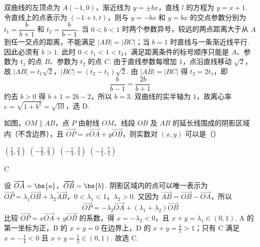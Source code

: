 \begin{solution}
双曲线的左顶点为 \(A(-1,0)\)，渐近线为 \(y=\pm bx\)，直线 \(l\) 的方程为 \(y=x+1\). 令直线上的点表示为 \((-1+t,t)\)，则与 \(y=-bx\) 和 \(y=bx\) 的交点参数分别为 \(t_1=\dfrac{b}{b+1}\) 和 \(t_2=\dfrac{b}{b-1}\). 当 \(0<b<1\) 时两个参数异号，较远的两点距离大于从 \(A\) 到任一交点的距离，不能满足 \(|AB|=|BC|\)；当 \(b=1\) 时直线与一条渐近线平行. 因此必须有 \(b>1\). 此时 \(0<t_1<1<t_2\)，满足距离条件的标号顺序只能是 \(A\)、参数为 \(t_1\) 的点 \(B\)、参数为 \(t_2\) 的点 \(C\). 由于直线参数每增加 \(1\)，点沿直线移动 \(\sqrt{2}\)，故
\(|AB|=t_1\sqrt{2}\)，\(|BC|=(t_2-t_1)\sqrt{2}\).
由 \(|AB|=|BC|\) 得 \(t_2=2t_1\)，即
\[
\frac{b}{b-1}=\frac{2b}{b+1}
\]
约去 \(b>0\) 得 \(b+1=2b-2\)，所以 \(b=3\). 双曲线的实半轴为 \(1\)，故离心率 \(e=\sqrt{1+b^2}=\sqrt{10}\)，选 D.
\end{solution}

\begin{problem}
如图，\(OM\parallel AB\)，点 \(P\) 由射线 \(OM\)、线段 \(OB\) 及 \(AB\) 的延长线围成的阴影区域内（不含边界），且 \(\overrightarrow{OP}=x\overrightarrow{OA}+y\overrightarrow{OB}\)，则实数对 \((x,y)\) 可以是（\quad）


\choices
    {\(\left(\frac{1}{4},\frac{3}{4}\right)\)}
    {\(\left(-\frac{2}{3},\frac{2}{3}\right)\)}
    {\(\left(-\frac{1}{4},\frac{3}{4}\right)\)}
    {\(\left(-\frac{1}{5},\frac{7}{5}\right)\)}
\end{problem}

\begin{answer}
C
\end{answer}

\begin{solution}
设 \(\overrightarrow{OA}=\bs{a}\)，\(\overrightarrow{OB}=\bs{b}\). 阴影区域内的点可以唯一表示为
\(\overrightarrow{OP}=\lambda_1\overrightarrow{OB}+\lambda_2\overrightarrow{AB}\)，\(0<\lambda_1<1\)，\(\lambda_2>0\).
又因为 \(\overrightarrow{AB}=\overrightarrow{OB}-\overrightarrow{OA}\)，所以
\[
\overrightarrow{OP}=-\lambda_2\overrightarrow{OA}+\left(\lambda_1+\lambda_2\right)\overrightarrow{OB}
\]
比较 \(\overrightarrow{OP}=x\overrightarrow{OA}+y\overrightarrow{OB}\) 的系数，得 \(x=-\lambda_2<0\)，且 \(x+y=\lambda_1\in(0,1)\). A 的第一坐标为正，B 的 \(x+y=0\) 在边界上，D 的 \(x+y=\frac65>1\)；只有 C 满足 \(x=-\frac14<0\) 且 \(x+y=\frac12\in(0,1)\). 故选 C.
\end{solution}

